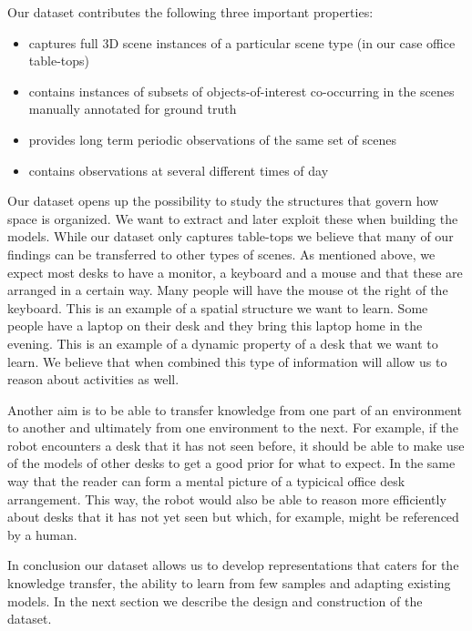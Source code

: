 \documentclass[letterpaper, 10 pt, conference]{ieeeconf}  %
\begin{document}
Our dataset contributes the following three important properties:
\begin{itemize}
	\item captures full 3D scene instances of a particular scene type (in our case office table-tops)
	\item contains instances of subsets of objects-of-interest co-occurring in the scenes manually annotated for ground truth
	\item provides long term periodic observations of the same set of scenes
	\item contains observations at several different times of day
\end{itemize}

Our dataset opens up the possibility to study the structures that govern how space is organized. We want to extract and later exploit these 
when building the models. While our dataset only captures table-tops we believe that many of our findings can be transferred to other types 
of scenes. As mentioned above, we expect most desks to have a monitor, a keyboard and a mouse and that these are arranged in a certain way. 
Many people will have the mouse ot the right of the keyboard. This is an example of a spatial structure we want to learn. Some people have a 
laptop on their desk and they bring this laptop home in the evening. This is an example of a dynamic property of a desk that we want to 
learn. We believe that when combined this type of information will allow us to reason about activities as well.

Another aim is to be able to transfer knowledge from one part of an
environment to another and ultimately from one environment to the
next. For example, if the robot encounters a desk that it has not seen
before, it should be able to make use of the models of other desks to
get a good prior for what to expect. In the same way that the reader
can form a mental picture of a typicical office desk arrangement.
This way, the robot would also be able to reason more efficiently
about desks that it has not yet seen but which, for example, might be
referenced by a human.

In conclusion our dataset allows us to develop representations that caters for the knowledge transfer, the ability to learn from few samples and adapting existing models. In the next section we describe the design and construction of the dataset.


\end{document}

